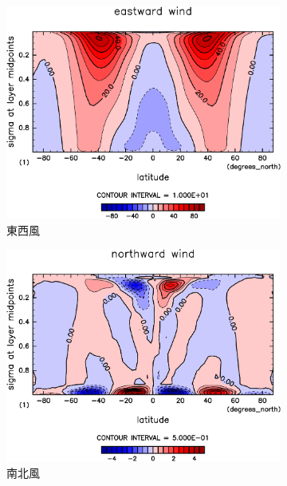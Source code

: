 \documentclass[body]{subfiles}
\begin{document}
\begin{figure}[t]
	\centering
	\begin{subfigure}{.4\textwidth}
		\centering
		\includegraphics[width=\columnwidth]{S1366-nc/U,time=3650:4015-crop-rotate.pdf}
		\caption{東西風\hmu*{[m/s]}}\label{S1366nc東西風}
	\end{subfigure}
	\begin{subfigure}{.4\textwidth}
		\centering
		\includegraphics[width=\columnwidth]{S1366-nc/V,time=3650:4015-crop-rotate.pdf}
		\caption{南北風\hmu*{[m/s]}}\label{S1366nc南北風}
	\end{subfigure}
	\begin{subfigure}{.4\textwidth}

\end{subfigure}
\end{figure}
\end{document}
